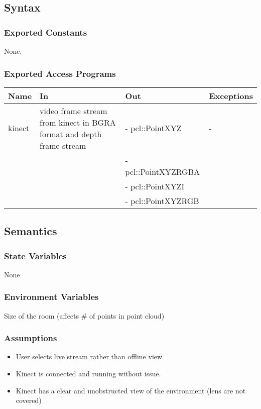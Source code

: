 \documentclass[12pt, titlepage]{article}
\begin{document}
\subsection{Syntax}

\subsubsection{Exported Constants}

None.

\subsubsection{Exported Access Programs}

\begin{center}
\begin{tabular}{p{2cm} p{4cm} p{5cm} p{2cm}}
\hline
\textbf{Name} & \textbf{In} & \textbf{Out} & \textbf{Exceptions} \\
\hline
kinect & video frame stream from kinect in BGRA format and depth frame stream
& - pcl::PointXYZ & - \\
 & & - pcl::PointXYZRGBA &  \\
 & & - pcl::PointXYZI &  \\
 & & - pcl::PointXYZRGB &  \\
\hline
\end{tabular}
\end{center}

\subsection{Semantics}

\subsubsection{State Variables}

None

\subsubsection{Environment Variables}

Size of the room (affects \# of points in point cloud)

\subsubsection{Assumptions}

\begin{itemize}
  \item User selects live stream rather than offline view
  \item Kinect is connected and running without issue.
  \item Kinect has a clear and unobstructed view of the environment (lens are not covered)
\end{itemize}
\end{document}
